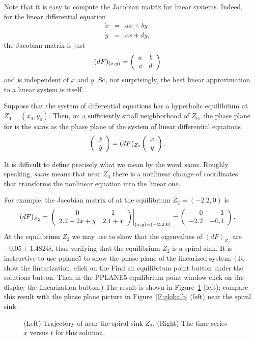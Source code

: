 \documentclass{ximera}
\begin{document}
Note that it is easy to compute the Jacobian matrix for linear 
systems.  Indeed, for the linear differential equation
\begin{eqnarray*}
\dot{x} & = & ax+by \\ \dot{y} & = & cx+dy,
\end{eqnarray*}
the Jacobian matrix is just 
\[
(dF)_{(x,y)} = \left(\begin{array}{rr} a & b\\ c &d\end{array}\right)
\]
and is independent of $x$ and $y$.  So, not surprisingly, the 
best linear approximation to a linear system is itself.

\begin{thm} \label{T:linearization} 
Suppose that the system of differential equations
 has a hyperbolic equilibrium at
$Z_0=(x_0,y_0)$.  Then, on a sufficiently small neighborhood of
$Z_0$, the phase plane for  is the {\em
same\/} as the phase plane of the system of 
linear differential equations
\begin{equation}  \label{e:linearizedeqn}
\left(\begin{array}{r} \dot{x} \\ \dot{y}\end{array}\right) = (dF)_{Z_0} \left(\begin{array}{r} x \\ y\end{array}\right).
\end{equation}
\end{thm}  
It is difficult to define precisely what we mean by the word
{\em same\/}. Roughly speaking, {\em same\/} means that near 
$Z_0$ there is a nonlinear change of coordinates that 
transforms the nonlinear equation into the linear one.

For example, the Jacobian matrix of  at the
equilibrium $Z_2=(-2.2,0)$ is 
\[
(dF)_{Z_2} = \left.\left(\begin{array}{cc} 0 & 1\\ 2.2+2x+y &2.1+x\end{array}\right)\right|_{(x,y)=(-2.2,0)} 
= \left(\begin{array}{rr} 0 & 1\\ -2.2 &-0.1\end{array}\right).
\]
At the equilibrium $Z_2$ we may use \Matlab to show that the 
eigenvalues of $(dF)_{Z_2}$ are $-0.05\pm 1.4824i$, thus verifying 
that the equilibrium $Z_2$ is a spiral sink.  
It is instructive to use {\sf pplane5} to 
show the phase plane of 
the linearized system.  
(To show the linearization, click on the 
{\sf Find an equilibrium point} button under the {\sf solutions} 
button.  Then in the {\sf PPLANE5 equilibrium point} window click 
on the {\sf display the linearization} button.)  The result is
shown in Figure~\ref{F:spiral} (left); compare this result 
with the phase plane picture in Figure~\ref{F:globalb} (left) 
near the spiral sink.

\begin{figure}[htb]
           \centerline{%
           }
           \caption{(Left) Trajectory of \protect{} 
	     near the spiral sink $Z_2$. (Right) The time series $x$ 
		versus $t$ for this solution.}
           \label{F:spiral}
\end{figure}
\end{document}
